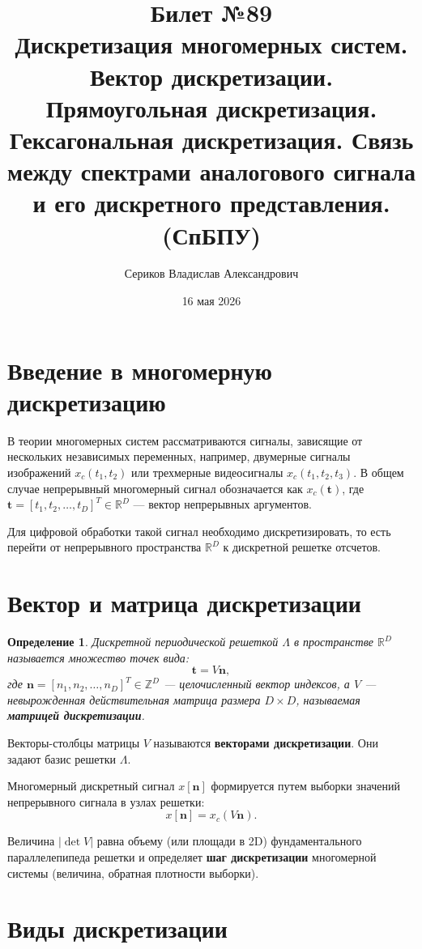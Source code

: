 \documentclass[12pt, a4paper]{article}
\title{Билет №89 \\ \small Дискретизация многомерных систем. Вектор дискретизации. Прямоугольная дискретизация. Гексагональная дискретизация. Связь между спектрами аналогового сигнала и его дискретного представления. (СпБПУ)}
\author{Сериков Владислав Александрович}
\date{16 мая 2026}
\newtheorem{definition}{Определение}
\begin{document}
\maketitle
\tableofcontents
\newpage

\section{Введение в многомерную дискретизацию}
В теории многомерных систем рассматриваются сигналы, зависящие от нескольких независимых переменных, например, двумерные сигналы изображений $x_c(t_1, t_2)$ или трехмерные видеосигналы $x_c(t_1, t_2, t_3)$. В общем случае непрерывный многомерный сигнал обозначается как $x_c(\mathbf{t})$, где $\mathbf{t} = [t_1, t_2, \dots, t_D]^T \in \mathbb{R}^D$ --- вектор непрерывных аргументов.

Для цифровой обработки такой сигнал необходимо дискретизировать, то есть перейти от непрерывного пространства $\mathbb{R}^D$ к дискретной решетке отсчетов.

\section{Вектор и матрица дискретизации}
\begin{definition}
Дискретной периодической решеткой $\Lambda$ в пространстве $\mathbb{R}^D$ называется множество точек вида:
\begin{equation}
    \mathbf{t} = V \mathbf{n},
\end{equation}
где $\mathbf{n} = [n_1, n_2, \dots, n_D]^T \in \mathbb{Z}^D$ --- целочисленный вектор индексов, а $V$ --- невырожденная действительная матрица размера $D \times D$, называемая \textbf{матрицей дискретизации}.
\end{definition}

Векторы-столбцы матрицы $V$ называются \textbf{векторами дискретизации}. Они задают базис решетки $\Lambda$.

Многомерный дискретный сигнал $x[\mathbf{n}]$ формируется путем выборки значений непрерывного сигнала в узлах решетки:
\begin{equation}
    x[\mathbf{n}] = x_c(V \mathbf{n}).
\end{equation}

Величина $|\det V|$ равна объему (или площади в 2D) фундаментального параллелепипеда решетки и определяет \textbf{шаг дискретизации} многомерной системы (величина, обратная плотности выборки).

\section{Виды дискретизации}
\end{document}
